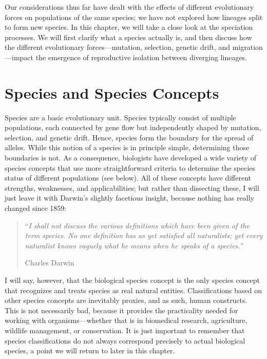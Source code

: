 \documentclass[
]{book}
\begin{document}
Our considerations thus far have dealt with the effects of different evolutionary forces on populations of the same species; we have not explored how lineages split to form new species. In this chapter, we will take a close look at the speciation processes. We will first clarify what a species actually is, and then discuss how the different evolutionary forces---mutation, selection, genetic drift, and migration---impact the emergence of reproductive isolation between diverging lineages.

\hypertarget{species-and-species-concepts}{%
\section{Species and Species Concepts}\label{species-and-species-concepts}}

Species are a basic evolutionary unit. Species typically consist of multiple populations, each connected by gene flow but independently shaped by mutation, selection, and genetic drift. Hence, species form the boundary for the spread of alleles. While this notion of a species is in principle simple, determining those boundaries is not. As a consequence, biologists have developed a wide variety of species concepts that use more straightforward criteria to determine the species status of different populations (see below). All of these concepts have different strengths, weaknesses, and applicabilities; but rather than dissecting these, I will just leave it with Darwin's slightly facetious insight, because nothing has really changed since 1859:

\begin{quote}
``\emph{I shall not discuss the various definitions which have been given of the term species. No one definition has as yet satisfied all naturalists; yet every naturalist knows vaguely what he means when he speaks of a species.''}

Charles Darwin
\end{quote}

I will say, however, that the biological species concept is the only species concept that recognizes and treats species as real natural entities. Classifications based on other species concepts are inevitably proxies, and as such, human constructs. This is not necessarily bad, because it provides the practicality needed for working with organisms---whether that is in biomedical research, agriculture, wildlife management, or conservation. It is just important to remember that species classifications do not always correspond precisely to actual biological species, a point we will return to later in this chapter.
\end{document}
